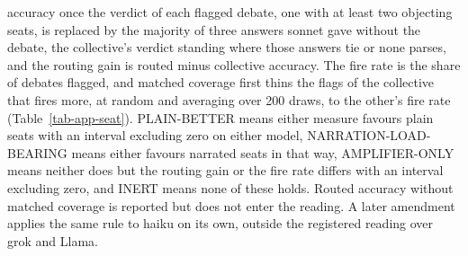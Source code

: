 accuracy once the verdict of each flagged debate, one with at least two
objecting seats, is replaced by the majority of three answers sonnet gave
without the debate, the collective's verdict standing where those answers tie
or none parses, and the routing gain is routed minus collective accuracy. The fire rate is the share of
debates flagged, and matched coverage first thins the flags of the
collective that fires more, at random and averaging over 200 draws, to the
other's fire rate (Table~\ref{tab-app-seat}).
PLAIN-BETTER means either
measure favours plain seats with an interval excluding zero on either
model, NARRATION-LOAD-BEARING means either favours narrated seats in that
way, AMPLIFIER-ONLY means neither does but the routing gain or the fire rate
differs with an interval excluding zero, and INERT means none of these
holds. Routed accuracy without matched coverage is reported but does not
enter the reading. A later amendment applies the same rule to haiku on its
own, outside the registered reading over grok and Llama.
